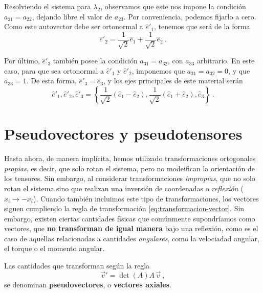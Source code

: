 \begin{ejemplo}
    Resolviendo el sistema para $\lambda_2$, observamos que este nos impone la condición $a_{21} = a_{22}$, dejando libre el valor de $a_{23}$. Por conveniencia, podemos fijarlo a cero. Como este autovector debe ser ortonormal a $\hat{e}'_1$, tenemos que será de la forma
    \begin{equation*}
        \hat{e}'_2 = \frac{1}{\sqrt{2}} \hat{e}_1 + \frac{1}{\sqrt{2}} \hat{e}_2 \ .
    \end{equation*}

    Por último, $\hat{e}'_3$ también posee la condición $a_{31} = a_{32}$, con $a_{33}$ arbitrario. En este caso, para que sea ortonormal a $\hat{e}'_1$ y $\hat{e}'_2$, imponemos que $a_{31} = a_{32} = 0$, y que $a_{33} = 1$. De esta forma, $\hat{e}'_3 = \hat{e}_3$, y los ejes principales de este material serán 
    \begin{equation*}
        {\hat{e}'_1, \hat{e}'_2, \hat{e}'_3} = \left\{ \frac{1}{\sqrt{2}}(\hat{e}_1 - \hat{e}_2), \frac{1}{\sqrt{2}}(\hat{e}_1 + \hat{e}_2), \hat{e}_3 \right\} \ .
    \end{equation*}
\end{ejemplo}


\section{Pseudovectores y pseudotensores}

Hasta ahora, de manera implícita, hemos utilizado transformaciones ortogonales \emph{propias}, es decir, que solo rotan el sistema, pero no modeifican la orientación de los tensores. Sin embargo, al considerar transformaciones \emph{impropias}, que no solo rotan el sistema sino que realizan una inversión de coordenadas o \emph{reflexión} ($x_i \to -x_i$). Cuando también incluimos este tipo de transformaciones, los vectores siguen cumpliendo la regla de transformación \eqref{eq:transformacion-vector}. Sin embargo, existen ciertas cantidades físicas que comúnmente supondríamos como vectores, que \textbf{no transforman de igual manera} bajo una reflexión, como es el caso de aquellas relacionadas a cantidades \emph{angulares}, como la velociadad angular, el torque o el momento angular.

\begin{defi} 
    Las cantidades que transforman según la regla
    \begin{equation} \label{eq:pseudovector}
        \vec{v}' = \det(A) A \, \vec{v} \ ,
    \end{equation}
    se denominan \textbf{pseudovectores}, o \textbf{vectores axiales}.
\end{defi}

